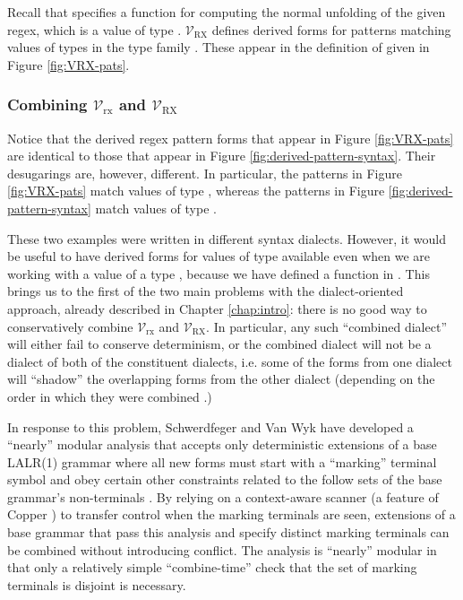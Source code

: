 {Recall that  specifies a function  for computing the normal unfolding of the given regex, which is a value of type . $\mathcal{V}_\text{RX}$ defines derived forms for patterns matching values of types in the type family . These appear in the definition of  given in Figure \ref{fig:VRX-pats}.


\subsubsection{Combining $\mathcal{V}_\text{rx}$ and $\mathcal{V}_\text{RX}$}

Notice that the derived regex pattern forms that appear in Figure \ref{fig:VRX-pats} are identical to those that appear in Figure \ref{fig:derived-pattern-syntax}. Their desugarings are, however, different. In particular, the patterns in Figure \ref{fig:VRX-pats} match values of type , whereas the patterns in Figure \ref{fig:derived-pattern-syntax} match values of type . 

These two examples were written in different syntax dialects. However, it would be useful to have derived forms for values of type  available even when we are working with a value of a type , because we have defined a function  in . This brings us to the first of the two main problems with the dialect-oriented approach, already described in Chapter \ref{chap:intro}: there is no good way to conservatively combine $\mathcal{V}_\text{rx}$ and $\mathcal{V}_\text{RX}$. In particular, any such ``combined dialect'' will either fail to conserve determinism, or the combined dialect will not be a dialect of both of the constituent dialects, i.e. some of the forms from one dialect will ``shadow'' the overlapping forms from the other dialect (depending on the order in which they were combined \cite{Ford04a}.) 

In response to this problem, Schwerdfeger and Van Wyk have developed a ``nearly'' modular analysis that accepts only deterministic extensions of a base LALR(1) grammar where all new forms must start with a ``marking'' terminal symbol and obey certain other constraints related to  the follow sets of the base grammar's non-terminals \cite{conf/pldi/SchwerdfegerW09}. By relying on a context-aware scanner (a feature of Copper \cite{conf/gpce/WykS07}) to transfer control when the marking terminals are seen, extensions of a base grammar that pass this analysis and specify distinct marking terminals can be combined without introducing conflict. The analysis is ``nearly'' modular in that only a relatively simple ``combine-time'' check that the set of marking terminals is disjoint is necessary.

}
